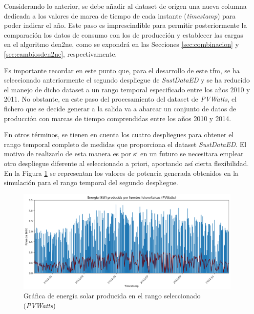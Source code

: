 \vspace{3mm}

Considerando lo anterior, se debe añadir al dataset de origen una nueva columna dedicada a los valores de marca de tiempo de cada instante (\textit{timestamp}) para poder indicar el año. Este paso es imprescindible para permitir posteriormente la comparación los datos de consumo con los de producción y establecer las cargas en el algoritmo \gls{den2ne}, como se expondrá en las Secciones \ref{sec:combinacion} y \ref{sec:cambiosden2ne}, respectivamente. 

\vspace{3mm}

Es importante recordar en este punto que, para el desarrollo de este \gls{tfm}, se ha seleccionado anteriormente el segundo despliegue de \textit{SustDataED} y se ha reducido el manejo de dicho dataset a un rango temporal especificado entre los años 2010 y 2011. No obstante, en este paso del procesamiento del dataset de \textit{PVWatts}, el fichero que se decide generar a la salida va a abarcar un conjunto de datos de producción con marcas de tiempo comprendidas entre los años 2010 y 2014. 

\vspace{3mm}

En otros términos, se tienen en cuenta los cuatro despliegues para obtener el rango temporal completo de medidas que proporciona el dataset \textit{SustDataED}. El motivo de realizarlo de esta manera es por si en un futuro se necesitara emplear otro despliegue diferente al seleccionado a priori, aportando así cierta flexibilidad. En la Figura \ref{fig:solaryearpv} se representan los valores de potencia generada obtenidos en la simulación para el rango temporal del segundo despliegue.

\vspace{3mm}

\begin{figure}[H]
  \centering
  \includegraphics[width=1\textwidth]{img/diseno/matplotsolaryearpvwatts.png}
  \caption{Gráfica de energía solar producida en el rango seleccionado (\textit{PVWatts})}
  \label{fig:solaryearpv}
\end{figure}

